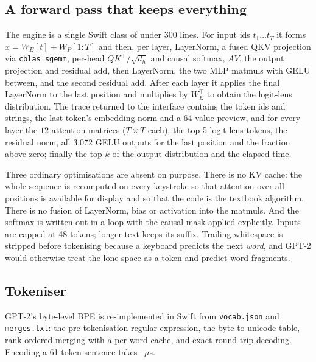 \documentclass[11pt]{article}
\begin{document}
\subsection{A forward pass that keeps everything}
The engine is a single Swift class of under 300 lines. For input ids $t_1\ldots t_T$ it forms $x = W_E[t] + W_P[1{:}T]$ and then, per layer, LayerNorm, a fused QKV projection via \texttt{cblas\_sgemm}, per-head $QK^\top/\sqrt{d_h}$ and causal softmax, $AV$, the output projection and residual add, then LayerNorm, the two MLP matmuls with GELU between, and the second residual add. After each layer it applies the final LayerNorm to the last position and multiplies by $W_E^\top$ to obtain the logit-lens distribution. The trace returned to the interface contains the token ids and strings, the last token's embedding norm and a 64-value preview, and for every layer the $12$ attention matrices ($T\times T$ each), the top-5 logit-lens tokens, the residual norm, all 3{,}072 GELU outputs for the last position and the fraction above zero; finally the top-$k$ of the output distribution and the elapsed time.

Three ordinary optimisations are absent on purpose. There is no KV cache: the whole sequence is recomputed on every keystroke so that attention over all positions is available for display and so that the code is the textbook algorithm. There is no fusion of LayerNorm, bias or activation into the matmuls. And the softmax is written out in a loop with the causal mask applied explicitly. Inputs are capped at 48 tokens; longer text keeps its suffix. Trailing whitespace is stripped before tokenising because a keyboard predicts the next \emph{word}, and GPT-2 would otherwise treat the lone space as a token and predict word fragments.

\subsection{Tokeniser}
GPT-2's byte-level BPE is re-implemented in Swift from \texttt{vocab.json} and \texttt{merges.txt}: the pre-tokenisation regular expression, the byte-to-unicode table, rank-ordered merging with a per-word cache, and exact round-trip decoding. Encoding a 61-token sentence takes \EncodeUsSim~$\mu$s.
\end{document}
